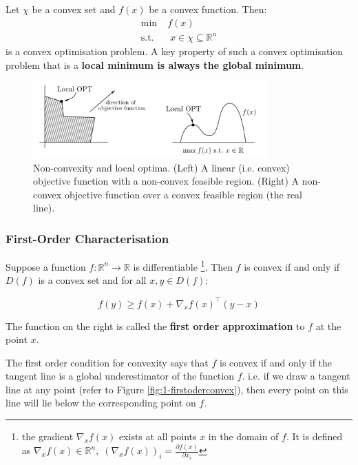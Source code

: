 \documentclass{article}
\begin{document}
\begin{theorem}
    Let $\chi$ be a convex set and $f(x)$ be a convex function. Then:
    \begin{align*}
        \min & \; f(x) \\ 
        \text{s.t.} & \; \; x \in \chi \subseteq \mathbb{R}^{n}
    \end{align*}
    \noindent is a convex optimisation problem. A key property of such a convex optimisation problem that is a \textbf{local minimum is always the global minimum}. 
\end{theorem}

\begin{figure}[H]
    \centering
    \includegraphics[width=0.8\textwidth]{Images/convexityfn3.png}
    \caption{Non-convexity and local optima. (Left) A linear (i.e. convex) objective function with a non-convex feasible region. (Right) A non-convex objective function over a convex feasible region (the real line).}
    \label{fig:1-convexfns3}
\end{figure} 

\subsubsection{First-Order Characterisation}
Suppose a function $f: \mathbb{R}^{n} \to \mathbb{R}$ is differentiable \footnote{the gradient $\nabla_x f(x)$ exists at all points $x$ in the domain of $f$. It is defined as $\nabla_x f(x) \in \mathbb{R}^{n}, \; (\nabla_x f(x))_i = \frac{\partial f(x)}{\partial x_i}$}. Then $f$ is convex if and only if $D(f)$ is a convex set and for all $x, y \in D(f)$:

\begin{equation}
    f(y) \geq f(x) + \nabla_x f(x)^{\top} (y-x)
\end{equation}

\noindent The function on the right is called the \textbf{first order approximation} to $f$ at the point $x$. 

\begin{theorem}
    The first order condition for convexity says that $f$ is convex if and only if the tangent line is a global underestimator of the function $f$. i.e. if we draw a tangent line at any point (refer to Figure \ref{fig:1-firstoderconvex}), then every point on this line will lie below the corresponding point on $f$. 
\end{theorem}
\end{document}
